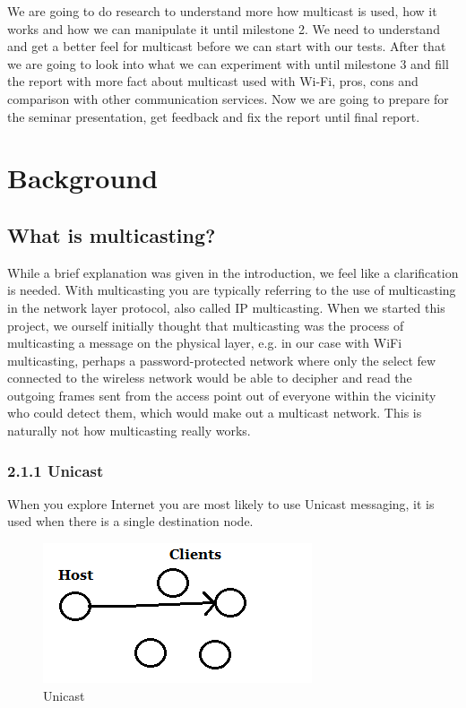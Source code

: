 \documentclass[9pt,a4paper]{acmproc}
\begin{document}
We are going to do research to understand more how multicast is used, how it works and how we can manipulate it until milestone 2. We need to understand and get a better feel for multicast before we can start with our tests. After that we are going to look into what we can experiment with until milestone 3 and fill the report with more fact about multicast used with Wi-Fi, pros, cons and comparison with other communication services. Now we are going to prepare for the seminar presentation, get feedback and fix the report until final report.

\newpage

\section{Background}

\subsection{What is multicasting?}

While a brief explanation was given in the introduction, we feel like a clarification is needed. With multicasting you are typically referring to the use of multicasting in the network layer protocol, also called IP multicasting. When we started this project, we ourself initially thought that multicasting was the process of multicasting a message on the physical layer, e.g. in our case with WiFi multicasting, perhaps a password-protected network where only the select few connected to the wireless network would be able to decipher and read the outgoing frames sent from the access point out of everyone within the vicinity who could detect them, which would make out a multicast network. This is naturally not how multicasting really works.
\subsubsection*{2.1.1 Unicast}

When you explore Internet you are most likely to use Unicast messaging, it is used when there is a single destination node. 

\begin{figure}[h!]
  \includegraphics[width=\linewidth]{unicast.png}
  \caption{Unicast}
  \label{fig:Unicast}
\end{figure}
\end{document}
